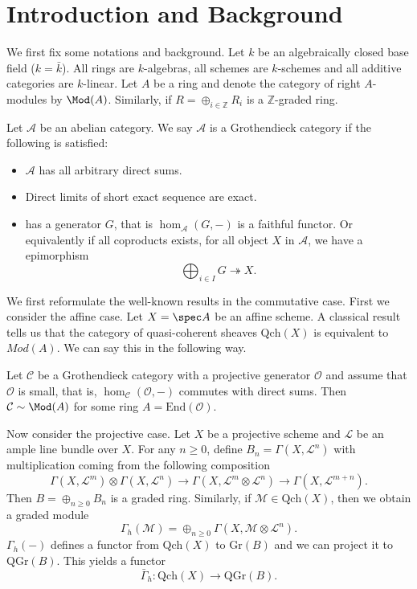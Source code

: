 \chapter{Introduction and Background}

We first fix some notations and background. Let \(k\) be an algebraically closed base field (\(k=\bar{k}\)). All rings are \(k\)-algebras, all schemes are \(k\)-schemes and all additive categories are \(k\)-linear. Let \(A\) be a ring and denote the category of right \(A\)-modules by \(\Mod(A)\). Similarly, if \(R=\oplus_{i\in \mathbb{Z}}R_i\) is a \(\mathbb{Z}\)-graded ring.

\begin{definition}
     Let \(\mathcal{A}\) be an abelian category. We say \(\mathcal{A}\) is a Grothendieck category if the following is satisfied:
     \begin{itemize}
      \item \(\mathcal{A}\) has all arbitrary direct sums.
      \item Direct limits of short exact sequence are exact. 
      \item {} has a generator \(G\), that is \(\hom_{\mathcal{A}}(G,-)\) is a faithful functor. Or equivalently if all coproducts exists, for all object \(X\) in \(\mathcal{A}\), we have a epimorphism 
      \[\bigoplus_{i \in I}G\twoheadrightarrow X.\]
     \end{itemize}
\end{definition}

We first reformulate the well-known results in the commutative case. First we consider the affine case. Let \(X=\spec A\) be an affine scheme. A classical result tells us that the category of quasi-coherent sheaves \(\mathrm{Qch}(X)\) is equivalent to \(Mod(A)\). We can say this in the following way.

\begin{proposition}
     Let \(\mathcal{C}\) be a Grothendieck category with a projective generator \(\mathcal{O}\) and assume that \(\mathcal{O}\) is small, that is, \(\hom_{\mathcal{C}}(\mathcal{O},-)\) commutes with direct sums. Then \(\mathcal{C}\sim \Mod(A)\) for some ring \(A=\mathrm{End}(\mathcal{O})\).
\end{proposition}

Now consider the projective case. Let \(X\) be a projective scheme and \(\mathcal{L}\) be an ample line bundle over \(X\). For any \(n\geq 0\), define \(B_n=\Gamma(X,\mathcal{L}^n)\) with multiplication coming from the following composition 
\[\Gamma(X,\mathcal{L}^m)\otimes \Gamma(X,\mathcal{L}^n)\rightarrow \Gamma(X,\mathcal{L}^m\otimes \mathcal{L}^n)\rightarrow \Gamma(X,\mathcal{L}^{m+n}).\]
Then \(B=\oplus_{n\geq 0}B_n\) is a graded ring. Similarly, if \(\mathcal{M}\in \mathrm{Qch}(X)\), then we obtain a graded module 
\[\Gamma_h(\mathcal{M})=\oplus_{n\geq 0}\Gamma(X,\mathcal{M}\otimes \mathcal{L}^n).\]
\(\Gamma_h(-)\) defines a functor from \(\mathrm{Qch}(X)\) to \(\mathrm{Gr}(B)\) and we can project it to \(\mathrm{QGr}(B)\). This yields a functor 
\[\bar{\Gamma}_h:\mathrm{Qch}(X)\rightarrow \mathrm{QGr}(B).\]

